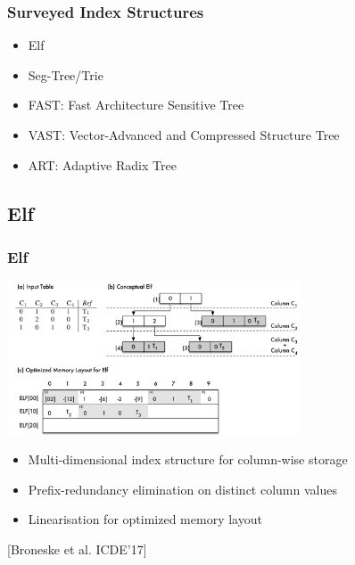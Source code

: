 \documentclass{beamer}
\begin{document}
\begin{frame}
\frametitle{Surveyed Index Structures}
\begin{itemize}
	\item Elf
	\item Seg-Tree/Trie
	\item FAST: Fast Architecture Sensitive Tree
	\item VAST: Vector-Advanced and Compressed Structure Tree
	\item ART: Adaptive Radix Tree
\end{itemize}
\end{frame}

\subsection{Elf}
\begin{frame}
	\frametitle{Elf}
	\begin{center}
		\includegraphics[width=0.65\textwidth]{img/elf.pdf}
	\end{center}
	\begin{itemize}
		\item Multi-dimensional index structure for column-wise storage
		\item Prefix-redundancy elimination on distinct column values
		\item Linearisation for optimized memory layout
	\end{itemize}
	\begin{center}
		\tiny [Broneske et al. ICDE’17]
	\end{center}
\end{frame}
\end{document}
